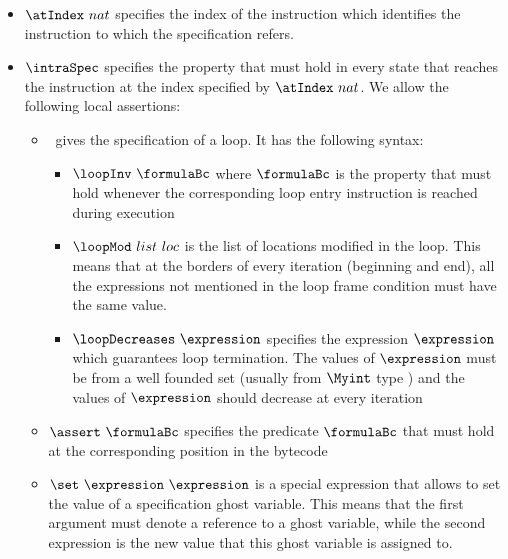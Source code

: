 \begin{itemize}
  \item $\atIndex \ nat$ specifies the index of the instruction which identifies the instruction
        to which the specification refers. 
  \item  $\intraSpec$ specifies the property that must hold in  every  state that reaches the instruction at the index  specified by $ \atIndex \ nat$.
         We allow the following local assertions:  
	 
\begin{itemize}
  \item  \loopSpec \ gives the specification of a loop. It has the following syntax: 
          \begin{itemize}
	     \item $\loopInv \  \formulaBc $  where $  \formulaBc $ is   the property that must hold  whenever the corresponding
	           loop entry instruction is reached during execution
             \item $\loopMod \ list \ loc$  is the list of locations modified in the loop. This means that at the borders
	           of every iteration (beginning and end), all the expressions not mentioned in the loop frame condition must have
		   the same value.  
             \item $ \loopDecreases \ \expression $ specifies the expression $\expression $ which guarantees loop termination. 
	           The values of   $\expression $ must be from a well founded set (usually from $\Myint$ type ) and the values
		    of   $\expression $ should decrease at every iteration 
            \end{itemize}

  \item  $  \assert \ \formulaBc $ specifies the predicate $\formulaBc $ that must hold at the corresponding position in the bytecode

  \item  $ \set \ \expression \  \expression $ is a special expression that allows to set the value of a specification ghost variable. This means
         that the first argument must denote a reference to a ghost variable, while the second expression is the new value that this 
	 ghost variable is assigned to.
\end{itemize}


\end{itemize}

